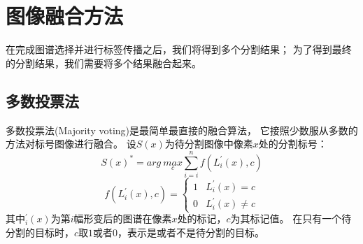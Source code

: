 \section{图像融合方法} %
在完成图谱选择并进行标签传播之后，我们将得到多个分割结果；
为了得到最终的分割结果，我们需要将多个结果融合起来。

\subsection{多数投票法}
%
%
%
多数投票法(Majority voting)是最简单最直接的融合算法，
它接照少数服从多数的方法对标号图像进行融合。
设$S(x)$为待分割图像中像素$x$处的分割标号：
\begin{equation}
  S(x)^\ast=arg\ \underset{c}{max}\sum_{i=i}^nf(L_i^\prime(x),c)
\end{equation}
\begin{equation}
  f(L_i^\prime(x),c)=
  \begin{cases}
    1& L_i^\prime(x)=c\\
    0& L_i^\prime(x)\ne c
  \end{cases}
\end{equation}
其中$_i^\prime(x)$为第$i$幅形变后的图谱在像素$x$处的标记，$c$为其标记值。
在只有一个待分割的目标时，$c$取$1$或者$0$，表示是或者不是待分割的目标。

